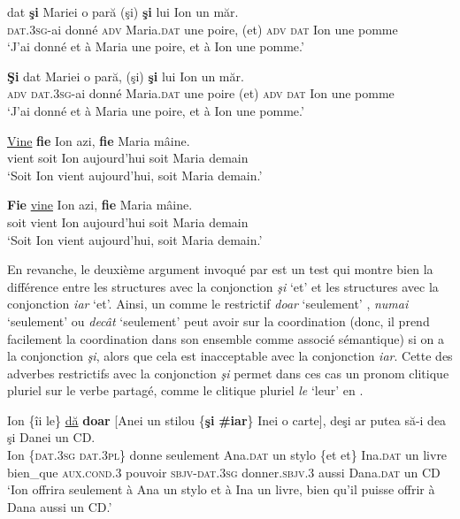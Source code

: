 \ea \label{ch2:ex303}
\ea 
\gll {}  dat  \textbf{şi}  Mariei  o  pară  (şi)  \textbf{şi}  lui  Ion  un  măr. \label{ch2:ex303a}\\
\textsc{dat.3sg}{}-ai  donné  \textsc{adv}  Maria.\textsc{dat}  une  poire,  (et)  \textsc{adv}  \textsc{dat}  Ion  une  pomme\\
\glt ‘J’ai donné et à Maria une poire, et à Ion une pomme.’

\ex 
\gll *\textbf{Şi}    dat  Mariei  o  pară,  (şi)  \textbf{şi}  lui  Ion  un  măr. \label{ch2:ex303b}\\
\textsc{adv} \textsc{dat.3sg}{}-ai  donné  Maria.\textsc{dat}  une  poire  (et)  \textsc{adv}  \textsc{dat}  Ion  une  pomme\\
\glt ‘J’ai donné et à Maria une poire, et à Ion une pomme.’ 
\z
\z


\ea \label{ch2:ex304}
\ea 
\gll \uline{Vine}  \textbf{fie}  Ion  azi,  \textbf{fie}  Maria  mâine. \label{ch2:ex304a}\\
 vient  soit  Ion  aujourd’hui  soit  Maria  demain\\
\glt ‘Soit Ion vient aujourd’hui, soit Maria demain.’

\ex 
\gll \textbf{Fie} \uline{vine}  Ion  azi,  \textbf{fie}  Maria  mâine. \label{ch2:ex304b}\\
soit  vient  Ion  aujourd’hui  soit  Maria  demain\\
\glt ‘Soit Ion vient aujourd’hui, soit Maria demain.’
\z
\z

En revanche, le deuxième argument invoqué par \citet{Mouret2006,Mouret2007,Mouret2008} est un test qui montre bien la différence entre les structures avec la conjonction \textit{şi} ‘et’ et les structures avec la conjonction \textit{iar} ‘et’. Ainsi, un  comme le restrictif \textit{doar} ‘seulement’ , \textit{numai} ‘seulement’  ou \textit{decât} ‘seulement’  peut avoir  sur la coordination (donc, il prend facilement la coordination dans son ensemble comme associé sémantique) si on a la conjonction \textit{şi}, alors que cela est inacceptable avec la conjonction \textit{iar}. Cette  des adverbes restrictifs avec la conjonction \textit{şi} permet dans ces cas un pronom clitique pluriel sur le verbe partagé, comme le clitique pluriel \textit{le} ‘leur’ en . 

\ea \label{ch2:ex305}
\ea 
\gll Ion  \{îi  {\textbar}  le\}  \uline{dă} \textbf{doar}  [Anei  un  stilou  \{\textbf{şi} {\textbar} \textbf{\#iar}\}  Inei o  carte],  deşi  ar  putea  să-i  dea  şi Danei  un  CD. \label{ch2:ex305a}\\
Ion  \{\textsc{dat.3sg} {\textbar} \textsc{dat.3pl}\} donne  seulement  Ana.\textsc{dat}  un  stylo  \{et {\textbar} et\}  Ina.\textsc{dat} un  livre  bien\_que  \textsc{aux.cond.3}  pouvoir  \textsc{sbjv-dat.3sg}  donner.\textsc{sbjv.3}  aussi Dana.\textsc{dat}  un  CD\\
\glt ‘Ion offrira seulement à Ana un stylo et à Ina un livre, bien qu’il puisse offrir à Dana aussi un CD.’

